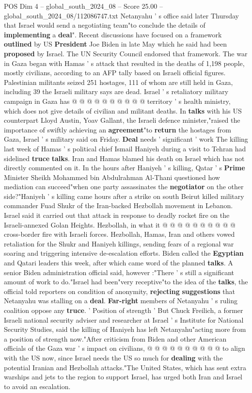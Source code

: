 \begin{textsample}{POS Dim 4 – global\_south\_2024\_08 – Score 25.00 – global\_south\_2024\_08/112086747.txt}
Netanyahu ' s office said later Thursday that Israel would send a negotiating team"to conclude the details of \textbf{implementing} a \textbf{deal}".
Recent discussions have focused on a framework \textbf{outlined} by US \textbf{President} Joe Biden in late May which he said had been \textbf{proposed} by Israel.
The UN Security Council endorsed that framework.
The war in Gaza began with Hamas ' s attack that resulted in the deaths of 1,198 people, mostly civilians, according to an AFP tally based on Israeli official figures.
Palestinian militants seized 251 hostages, 111 of whom are still held in Gaza, including 39 the Israeli military says are dead.
Israel ' s retaliatory military campaign in Gaza has @ @ @ @ @ @ @ @ @ @ territory ' s health ministry, which does not give details of civilian and militant deaths.
In \textbf{talks} with his US counterpart Lloyd Austin, Yoav Gallant, the Israeli defence minister,"raised the importance of swiftly achieving an \textbf{agreement}"to \textbf{return} the hostages from Gaza, Israel ' s military said on Friday. \textbf{Deal} needs ' significant ' work The killing last week of Hamas ' s political chief Ismail Haniyeh during a visit to Tehran had sidelined \textbf{truce} \textbf{talks}.
Iran and Hamas blamed his death on Israel which has not directly commented on it.
In the hours after Haniyeh ' s killing, Qatar ' s \textbf{Prime} Minister Sheikh Mohammed bin Abdulrahman Al-Thani questioned how mediation can succeed"when one party assassinates the \textbf{negotiator} on the other side?"Haniyeh ' s killing came hours after a strike on south Beirut killed military commander Fuad Shukr of the Iran-backed Hezbollah movement in Lebanon.
Israel said it carried out that attack in response to deadly rocket fire on the Israeli-annexed Golan Heights.
Hezbollah, in what it @ @ @ @ @ @ @ @ @ @ cross-border fire with Israeli forces.
Hezbollah, Hamas, Iran and others vowed retaliation for the Shukr and Haniyeh killings, sending fears of a regional war soaring and triggering intensive de-escalation efforts.
Biden called the \textbf{Egyptian} and Qatari leaders this week, after which came word of the planned \textbf{talks}.
A senior Biden administration official said, however :"There ' s still a significant amount of work to do."Israel had been"very receptive"to the idea of the \textbf{talks}, the official told reporters on condition of anonymity, \textbf{rejecting} \textbf{suggestions} that Netanyahu was stalling on a \textbf{deal}. \textbf{Far-right} members of Netanyahu ' s ruling coalition oppose any \textbf{truce}. ' Position of strength ' But Chuck Freilich, a former Israeli national security adviser and researcher at Israel ' s Institute for National Security Studies, said the killing of Haniyeh has left Netanyahu"acting more from a position of strength now."After criticism from Biden and other American officials of the Gaza war ' s impact on civilians, @ @ @ @ @ @ @ @ @ @ to align with the US now, since Israel needs the US so much for \textbf{dealing} with the potential Iranian and Hezbollah attacks."The United States, which has sent extra warships and jets to the region to support Israel, has urged both Iran and Israel to avoid an escalation.

\end{textsample}
